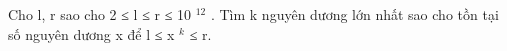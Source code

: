 Cho l, r sao cho 2 ≤ l ≤ r ≤ 10   $^    12   $   . Tìm k nguyên dương lớn nhất sao cho tồn tại số nguyên dương x để l ≤ x   $^    k   $   ≤ r.